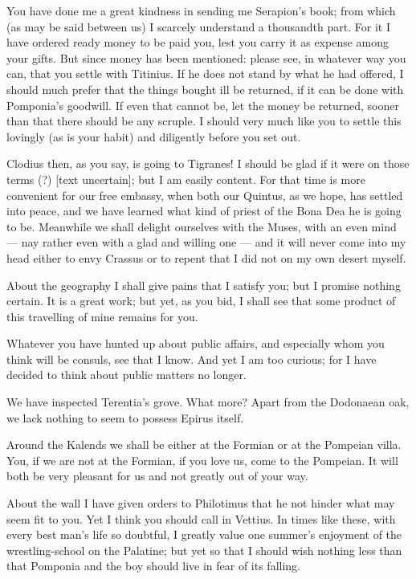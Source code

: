 

 You have done me a great kindness in sending me Serapion's book; from which (as may be said between us) I scarcely understand a thousandth part. For it I have ordered ready money to be paid you, lest you carry it as expense among your gifts. But since money has been mentioned: please see, in whatever way you can, that you settle with Titinius. If he does not stand by what he had offered, I should much prefer that the things bought ill be returned, if it can be done with Pomponia's goodwill. If even that cannot be, let the money be returned, sooner than that there should be any scruple. I should very much like you to settle this lovingly (as is your habit) and diligently before you set out.

 Clodius then, as you say, is going to Tigranes! I should be glad if it were on those terms (?) [text uncertain]; but I am easily content. For that time is more convenient for our free embassy, when both our Quintus, as we hope, has settled into peace, and we have learned what kind of priest of the Bona Dea he is going to be. Meanwhile we shall delight ourselves with the Muses, with an even mind --- nay rather even with a glad and willing one --- and it will never come into my head either to envy Crassus or to repent that I did not on my own desert myself.

 About the geography I shall give pains that I satisfy you; but I promise nothing certain. It is a great work; but yet, as you bid, I shall see that some product of this travelling of mine remains for you.

 Whatever you have hunted up about public affairs, and especially whom you think will be consuls, see that I know. And yet I am too curious; for I have decided to think about public matters no longer.

 We have inspected Terentia's grove. What more? Apart from the Dodonaean oak, we lack nothing to seem to possess Epirus itself.

 Around the Kalends we shall be either at the Formian or at the Pompeian villa. You, if we are not at the Formian, if you love us, come to the Pompeian. It will both be very pleasant for us and not greatly out of your way.

 About the wall I have given orders to Philotimus that he not hinder what may seem fit to you. Yet I think you should call in Vettius. In times like these, with every best man's life so doubtful, I greatly value one summer's enjoyment of the wrestling-school on the Palatine; but yet so that I should wish nothing less than that Pomponia and the boy should live in fear of its falling.
